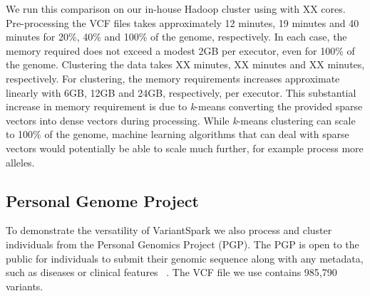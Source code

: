 \documentclass{bmcart}
\newcommand{\variantSpark}{{\sc VariantSpark}}
\newcommand{\kMeans}{\textit{k}-means}
\begin{document}
We run this comparison on our in-house Hadoop cluster using with XX cores.
Pre-processing the VCF files takes approximately 12 minutes, 19 minutes and 40 minutes for 20\%, 40\% and 100\% of the genome, respectively.
In each case, the memory required does not exceed a modest 2GB per executor, even for 100\% of the genome. 
Clustering the data takes XX minutes, XX minutes and XX minutes, respectively.
For clustering, the memory requirements increases approximate linearly with 6GB, 12GB and 24GB, respectively, per executor. 
This substantial increase in memory requirement is due to \kMeans{} converting the provided sparse vectors into dense vectors during processing.  
While \kMeans{} clustering can scale to 100\% of the genome, machine learning algorithms that can deal with sparse vectors would potentially be able to scale much further, for example process more alleles.





\subsection*{Personal Genome Project}
To demonstrate the versatility of \variantSpark{} we also process and cluster individuals from the Personal Genomics Project (PGP). The PGP is open to the public for individuals to submit their genomic sequence along with any metadata, such as diseases or clinical features ~\cite{Lunshof2013}.
The VCF file we use contains 985,790 variants.
\end{document}
